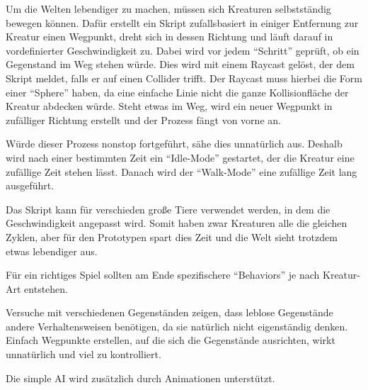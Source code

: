 
Um die Welten lebendiger zu machen, müssen sich Kreaturen selbstständig bewegen können. Dafür erstellt ein Skript zufallsbasiert in einiger Entfernung zur Kreatur einen Wegpunkt, dreht sich in dessen Richtung und läuft darauf in vordefinierter Geschwindigkeit zu. Dabei wird vor jedem \enquote{Schritt} geprüft, ob ein Gegenstand im Weg stehen würde. Dies wird mit einem Raycast gelöst, der dem Skript meldet, falls er auf einen Collider trifft. Der Raycast muss hierbei die Form einer \enquote{Sphere} haben, da eine einfache Linie nicht die ganze Kollisionfläche der Kreatur abdecken würde. Steht etwas im Weg, wird ein neuer Wegpunkt in zufälliger Richtung erstellt und der Prozess fängt von vorne an.

Würde dieser Prozess nonstop fortgeführt, sähe dies unnatürlich aus. Deshalb wird nach einer bestimmten Zeit ein \enquote{Idle-Mode} gestartet, der die Kreatur eine zufällige Zeit stehen lässt. Danach wird der \enquote{Walk-Mode} eine zufällige Zeit lang ausgeführt.

Das Skript kann für verschieden große Tiere verwendet werden, in dem die Geschwindigkeit angepasst wird. Somit haben zwar Kreaturen alle die gleichen Zyklen, aber für den Prototypen spart dies Zeit und die Welt sieht trotzdem etwas lebendiger aus.

Für ein richtiges Spiel sollten am Ende spezifischere \enquote{Behaviors} je nach Kreatur-Art entstehen.

Versuche mit verschiedenen Gegenständen zeigen, dass leblose Gegenstände andere Verhaltensweisen benötigen, da sie natürlich nicht eigenständig denken. Einfach Wegpunkte erstellen, auf die sich die Gegenstände ausrichten, wirkt unnatürlich und viel zu kontrolliert.

Die simple AI wird zusätzlich durch Animationen unterstützt.